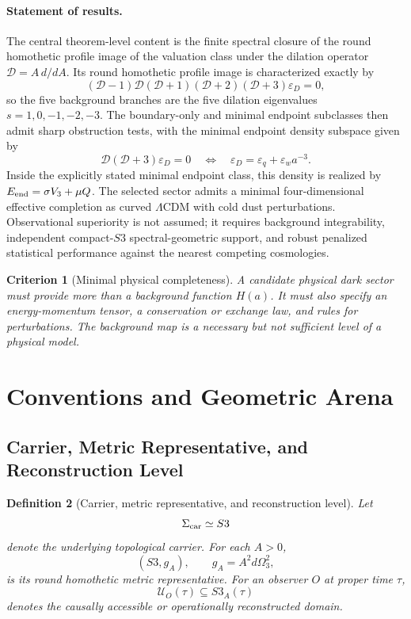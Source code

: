 \documentclass[11pt,a4paper]{article}
\def\Sthree{S3}%
\def\dd{d}%
\numberwithin{equation}{section}
\newtheorem{criterion}{Criterion}
\newtheorem{definition}[criterion]{Definition}
\theoremstyle{remark}
\newcommand{\Sthree}{S^3}
\newcommand{\Dom}{\mathcal{U}}
\newcommand{\Dil}{\mathscr{D}}
\newcommand{\epsD}{\varepsilon_D}
\newcommand{\dd}{\mathrm{d}}
\begin{document}
\paragraph{Statement of results.}
The central theorem-level content is the finite spectral closure of the round homothetic profile image of the valuation class under the dilation operator \(\Dil=A\,\dd/\dd A\). Its round homothetic profile image is characterized exactly by
\begin{equation}
(\Dil-1)\Dil(\Dil+1)(\Dil+2)(\Dil+3)\epsD=0,
\end{equation}
so the five background branches are the five dilation eigenvalues \(s=1,0,-1,-2,-3\). The boundary-only and minimal endpoint subclasses then admit sharp obstruction tests, with the minimal endpoint density subspace given by
\begin{equation}
\Dil(\Dil+3)\epsD=0
\quad\Longleftrightarrow\quad
\epsD=\varepsilon_q+\varepsilon_w a^{-3}.
\end{equation}
Inside the explicitly stated minimal endpoint class, this density is realized by \(E_{\rm end}=\sigma V_3+\mu Q\). The selected sector admits a minimal four-dimensional effective completion as curved \(\Lambda\)CDM with cold dust perturbations. Observational superiority is not assumed; it requires background integrability, independent compact-\(\Sthree\) spectral-geometric support, and robust penalized statistical performance against the nearest competing cosmologies.

\begin{criterion}[Minimal physical completeness]
A candidate physical dark sector must provide more than a background function \(H(a)\). It must also specify an energy-momentum tensor, a conservation or exchange law, and rules for perturbations. The background map is a necessary but not sufficient level of a physical model.
\end{criterion}

\section{Conventions and Geometric Arena}
\subsection{Carrier, Metric Representative, and Reconstruction Level}
\begin{definition}[Carrier, metric representative, and reconstruction level]
Let
\begin{equation}
\Sigma_{\rm car}\simeq \Sthree
\end{equation}
denote the underlying topological carrier. For each \(A>0\),
\begin{equation}
(\Sthree,g_A),\qquad g_A=A^2\dd\Omega_3^2,
\end{equation}
is its round homothetic metric representative. For an observer \(O\) at proper time \(\tau\),
\begin{equation}
\Dom_O(\tau)\subseteq \Sthree_A(\tau)
\end{equation}
denotes the causally accessible or operationally reconstructed domain.
\end{definition}
\end{document}
